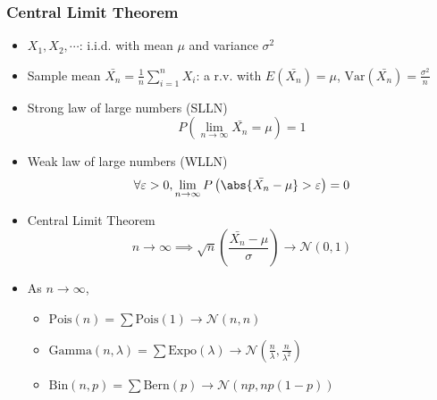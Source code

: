 \subsubsection*{Central Limit Theorem}
\begin{itemize}
    \item $X_1,X_2,\cdots$: i.i.d. with mean $\mu$ and variance $\sigma^2$
    \item Sample mean $\bar{X_n}=\frac{1}{n}\sum_{i=1}^nX_i$: a r.v. with $E\left(\bar{X_n}\right)=\mu$, $\text{Var}\left(\bar{X_n}\right)=\frac{\sigma^2}{n}$
    \item Strong law of large numbers (SLLN)
    \begin{equation}
        P\left(\lim_{n\to\infty}\bar{X_n}=\mu\right)=1
    \end{equation}
    \item Weak law of large numbers (WLLN)
    \begin{equation}
        \forall\varepsilon>0,\lim_{n\to\infty}P\left(\abs{\bar{X_n}-\mu}>\varepsilon\right)=0
    \end{equation}
    \item Central Limit Theorem
    \begin{equation}
        n\to\infty\implies\sqrt{n}\left(\frac{\bar{X_n}-\mu}{\sigma}\right)\to\mathcal{N}(0,1)
    \end{equation}
    \item As $n\to\infty$,
    \begin{itemize}
        \item $\text{Pois}(n)=\sum\text{Pois}(1)\to\mathcal{N}(n,n)$
        \item $\text{Gamma}(n,\lambda)=\sum\text{Expo}(\lambda)\to\mathcal{N}\left(\frac{n}{\lambda},\frac{n}{\lambda^2}\right)$
        \item $\text{Bin}(n,p)=\sum\text{Bern}(p)\to\mathcal{N}(np,np(1-p))$
    \end{itemize}
\end{itemize}
